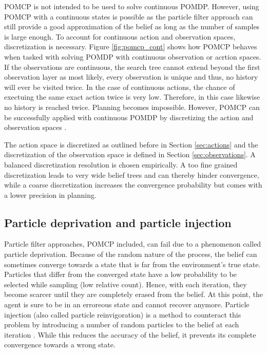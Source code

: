 POMCP is not intended to be used to solve continuous POMDP. However, using POMCP with a continuous states is possible as the particle filter approach can still provide a good approximation of the belief as long as the number of samples is large enough. To account for continuous action and observation spaces, discretization is necessary. Figure \ref{fig:pomcp_cont} shows how POMCP behaves when tasked with solving POMDP with continuous observation or acrtion spaces. If the observations are continuous, the search tree cannot extend beyond the first observation layer as most likely, every observation is unique and thus, no history will ever be visited twice. In the case of continuous actions, the chance of exectuing the same exact action twice is very low. Therefore, in this case likewise no history is reached twice. Planning becomes impossible. However, POMCP can be successfully applied with continuous POMDP by discretizing the action and observation spaces \parencite{pomcp_continuous}.

The action space is discretized as outlined before in Section \ref{sec:actions} and the discretization of the observation space is defined in Section \ref{sec:observations}. A balanced discretization resolution is chosen empirically. A too fine grained discretization leads to very wide belief trees and can thereby hinder convergence, while a coarse discretization increases the convergence probability but comes with a lower precision in planning.

\subsection{Particle deprivation and particle injection}
\label{sec:particle_deprivation}

Particle filter approaches, POMCP included, can fail due to a phenomenon called particle deprivation. Because of the random nature of the process, the belief can sometimes converge towards a state that is far from the environment's true state. Particles that differ from the converged state have a low probability to be selected while sampling (low relative count). Hence, with each iteration, they become scarcer until they are completely erased from the belief. At this point, the agent is sure to be in an erroreous state and cannot recover anymore. Particle injection (also called particle reinvigoration) is a method to counteract this problem by introducing a number of random particles to the belief at each iteration \parencite{decision_making_book}. While this reduces the accuracy of the belief, it prevents its complete convergence towards a wrong state. 

